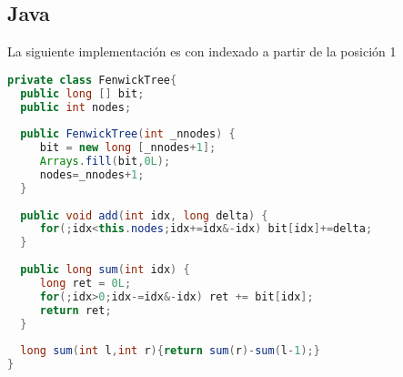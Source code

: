 \subsection{Java}
La siguiente implementación es con indexado a partir de la posición 1
\begin{lstlisting}[language=Java]
private class FenwickTree{
  public long [] bit;
  public int nodes;
	
  public FenwickTree(int _nnodes) {
     bit = new long [_nnodes+1];
     Arrays.fill(bit,0L);
     nodes=_nnodes+1;
  }
	
  public void add(int idx, long delta) {
     for(;idx<this.nodes;idx+=idx&-idx) bit[idx]+=delta;
  }
	
  public long sum(int idx) {
     long ret = 0L;
     for(;idx>0;idx-=idx&-idx) ret += bit[idx];
     return ret;
  }
	
  long sum(int l,int r){return sum(r)-sum(l-1);}
}
\end{lstlisting}